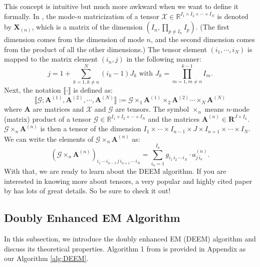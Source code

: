 \documentclass[11pt]{article}
\begin{document}
This concept is intuitive but much more awkward when we want to define it formally. In \cite{kolda2009review}, the mode-$n$ matricization of a tensor $\mathcal{X} \in \mathbb{R}^{I_1 \times I_2 \times \cdots \times I_N}$ is denoted by $\mathbf{X}_{(n)}$, which is a matrix of the dimension $(I_n, \prod_{p \ne I_n} I_p)$. (The first dimension comes from the dimension of mode $n$, and the second dimension comes from the product of all the other dimensions.) The tensor element $(i_1, \cdots, i_N)$ is mapped to the matrix element $(i_n, j)$ in the following manner: 
\begin{equation*}
    j = 1 + \sum_{k=1,k\ne n}^N (i_k - 1) J_k \text{ with } J_k = \prod_{m=1,m \ne n}^{k-1} I_m.
\end{equation*}
Next, the notation $\llbracket \cdot \rrbracket$ is defined as: 
\begin{equation*}
    \llbracket \mathcal{G}; \mathbf{A}^{(1)}, \mathbf{A}^{(2)}, \cdots, \mathbf{A}^{(N)} \rrbracket := \mathcal{G} \times_1 \mathbf{A}^{(1)} \times_2 \mathbf{A}^{(2)} 
    \cdots 
    \times_N \mathbf{A}^{(N)}
\end{equation*}
where $\mathbf{A}$ are matrices and $\mathcal{X}$ and $\mathcal{G}$ are tensors. The symbol $\times_n$ means $n$-mode (matrix) product of a tensor $\mathcal{G} \in \mathbb{R}^{I_1 \times I_2 \times \cdots \times I_N}$ and the matrices $\mathbf{A}^{(n)} \in \mathbf{R}^{J \times I_n}$. $\mathcal{G} \times_n \mathbf{A}^{(n)}$ is then a tensor of the dimension $I_1 \times \cdots \times I_{n-1} \times J \times I_{n+1} \times \cdots \times I_N$. We can write the elements of $\mathcal{G} \times_n \mathbf{A}^{(n)}$ as:
\begin{equation*}
    (\mathcal{G} \times_n \mathbf{A}^{(n)})_{i_1 \, \cdots \, i_{n-1} \, j  \, i_{n+1} \, \cdots \, i_N} = \sum_{i_n = 1}^{I_n} g_{i_1 \, i_2 \, \cdots \, i_N} \cdot a^{(n)}_{j\, i_n}.  
\end{equation*}
With that, we are ready to learn about the DEEM algorithm. If you are interested in knowing more about tensors, a very popular and highly cited paper by \cite{kolda2009review} has lots of great details. So be sure to check it out! 

\subsection{Doubly Enhanced EM Algorithm}
In this subsection, we introduce the doubly enhanced EM (DEEM) algorithm and discuss its theoretical properties. Algorithm 1 from \cite{mai2022DEEM} is provided in Appendix as our Algorithm \ref{alg:DEEM}.
\end{document}
